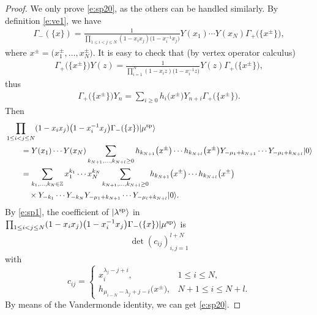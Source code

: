 \documentclass[pdftex]{sigma}
\numberwithin{equation}{section}
\begin{document}
\begin{proof} We only prove \eqref{e:sp20}, as the others can be handled similarly. By definition \eqref{e:ve1}, we have
\begin{align*}
\Gamma_-(\{x\})=\frac{1}{\prod_{1\leq i<j\leq N}(1-x_ix_j)\big(1-x^{-1}_ix_j\big)}Y(x_1)\cdots Y(x_N)\Gamma_+\big(\big\{x^\pm\big\}\big),
\end{align*}
where $x^\pm=\big(x^\pm_1,\dots,x^\pm_N\big)$. It is easy to check that (by vertex operator calculus)
\begin{align*}
\Gamma_+\big(\big\{x^\pm\big\}\big)Y(z)=\frac{1}{\prod^N_{i=1}(1-x_iz)\big(1-x^{-1}_iz\big)}Y(z)\Gamma_+\big(\big\{x^\pm\big\}\big),
\end{align*}
thus
\begin{align*}
\Gamma_+\big(\big\{x^\pm\big\}\big)Y_n=\sum_{i\geq 0}h_i\big(x^\pm\big)Y_{n+i}\Gamma_+\big(\big\{x^\pm\big\}\big).
\end{align*}
Then
\begin{align*}
&\prod_{1\leq i<j\leq N}(1-x_ix_j)\big(1-x^{-1}_ix_j\big)\Gamma_-(\{x\})|\mu^{\rm sp}\rangle\\
&\qquad{}=Y(x_1)\cdots Y(x_N)\sum_{k_{N+1},\dots,k_{N+l}\geq 0}h_{k_{N+1}}\big(x^\pm\big)\cdots h_{k_{N+l}}\big(x^\pm\big)Y_{-\mu_1+k_{N+1}}\cdots Y_{-\mu_l+k_{N+l}}|0\rangle\\
&\qquad{}=\sum_{k_1,\dots,k_N\in \mathbb{Z}}x^{k_1}_1\cdots x^{k_N}_N\sum_{k_{N+1},\dots,k_{N+l}\geq 0}h_{k_{N+1}}\big(x^\pm\big)\cdots h_{k_{N+l}}\big(x^\pm\big)\\
&\qquad\quad{} \times Y_{-k_1}\cdots Y_{-k_N} Y_{-\mu_1+k_{N+1}}\cdots Y_{-\mu_l+k_{N+l}}|0\rangle.
\end{align*}
By \eqref{e:sp1}, the coefficient of $|\lambda^{\rm sp}\rangle$ in $\prod_{1\leq i<j\leq N}(1-x_ix_j)\big(1-x^{-1}_ix_j\big)\Gamma_-(\{x\})|\mu^{\rm sp}\rangle$ is
\begin{align*}
\det(c_{ij})^{l+N}_{i,j=1}
\end{align*}
with
\[
c_{ij}=\begin{cases}
x^{\lambda_j-j+i}_i, & 1\leq i\leq N,\\
h_{\mu_{i-N}-\lambda_j+j-i}\big(x^{\pm}\big), & N+1\leq i\leq N+l.
\end{cases}
\]
By means of the Vandermonde identity, we can get \eqref{e:sp20}.
\end{proof}
\end{document}
